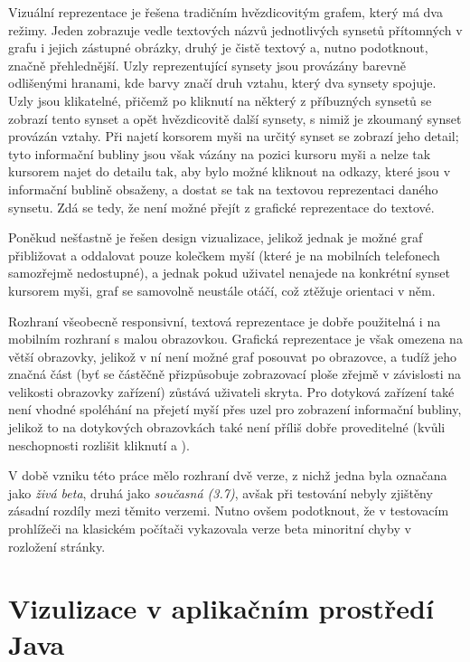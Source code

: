 \documentclass[a4paper, 11pt, oneside]{book}
\begin{document}
					Vizuální reprezentace je řešena tradičním hvězdicovitým grafem, který má dva režimy. Jeden zobrazuje vedle textových názvů jednotlivých synsetů přítomných v grafu i jejich zástupné obrázky, druhý je čistě textový a, nutno podotknout, značně přehlednější. Uzly reprezentující synsety jsou provázány barevně odlišenými hranami, kde barvy značí druh vztahu, který dva synsety spojuje. Uzly jsou klikatelné, přičemž po kliknutí na některý z příbuzných synsetů se zobrazí tento synset a opět hvězdicovitě další synsety, s nimiž je zkoumaný synset provázán vztahy. Při najetí korsorem myši na určitý synset se zobrazí jeho detail; tyto informační bubliny jsou však vázány na pozici kursoru myši a nelze tak kursorem najet do detailu tak, aby bylo možné kliknout na odkazy, které jsou v informační bublině obsaženy, a dostat se tak na textovou reprezentaci daného synsetu. Zdá se tedy, že není možné přejít z grafické reprezentace do textové.

					Poněkud nešťastně je řešen design vizualizace, jelikož jednak je možné graf přibližovat a oddalovat pouze kolečkem myší (které je na mobilních telefonech samozřejmě nedostupné), a jednak pokud uživatel nenajede na konkrétní synset kursorem myši, graf se samovolně neustále otáčí, což ztěžuje orientaci v něm.

					Rozhraní všeobecně responsivní, textová reprezentace je dobře použitelná i na mobilním rozhraní s malou obrazovkou. Grafická reprezentace je však omezena na větší obrazovky, jelikož v ní není možné graf posouvat po obrazovce, a tudíž jeho značná část (byť se částěčně přizpůsobuje zobrazovací ploše zřejmě v závislosti na velikosti obrazovky zařízení) zůstává uživateli skryta. Pro dotyková zařízení také není vhodné spoléhání na přejetí myší přes uzel pro zobrazení informační bubliny, jelikož to na dotykových obrazovkách také není příliš dobře proveditelné (kvůli neschopnosti rozlišit kliknutí a ).

					V době vzniku této práce mělo rozhraní dvě verze, z nichž jedna byla označana jako \textit{živá beta}, druhá jako \textit{současná (3.7)}, avšak při testování nebyly zjištěny zásadní rozdíly mezi těmito verzemi. Nutno ovšem podotknout, že v testovacím prohlížeči na klasickém počítači vykazovala verze beta minoritní chyby v rozložení stránky.

			\section{Vizulizace v aplikačním prostředí Java}
\end{document}
